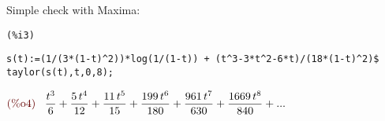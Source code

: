 Simple check with Maxima:

\noindent
\begin{minipage}[t]{8ex}{\color{red}\bf
\begin{verbatim}
(%i3) 
\end{verbatim}}
\end{minipage}
\begin{minipage}[t]{\textwidth}{\color{blue}
\begin{verbatim}
s(t):=(1/(3*(1-t)^2))*log(1/(1-t)) + (t^3-3*t^2-6*t)/(18*(1-t)^2)$
taylor(s(t),t,0,8);
\end{verbatim}}
\end{minipage}
\begin{math}\displaystyle
\parbox{8ex}{\color{labelcolor}(\%o4) }
\frac{{t}^{3}}{6}+\frac{5\,{t}^{4}}{12}+\frac{11\,{t}^{5}}{15}+\frac{199\,{t}^{6}}{180}+\frac{961\,{t}^{7}}{630}+\frac{1669\,{t}^{8}}{840}+...
\end{math}










